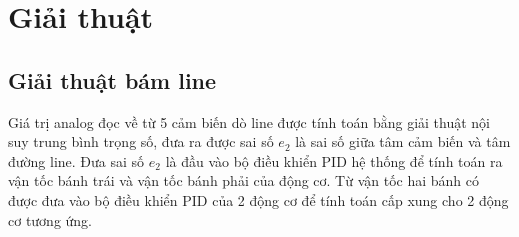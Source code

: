      \section{Giải thuật}
          \subsection{Giải thuật bám line}
               \hspace*{0.6cm}Giá trị analog đọc về từ 5 cảm biến dò line được tính toán bằng giải thuật nội suy
               trung bình trọng số, đưa ra được sai số $e_2$ là sai số giữa tâm cảm biến và tâm đường
               line. Đưa sai số $e_2$ là đầu vào bộ điều khiển PID hệ thống để tính toán ra vận tốc
               bánh trái và vận tốc bánh phải của động cơ. Từ vận tốc hai bánh có được đưa vào bộ
               điều khiển PID của 2 động cơ để tính toán cấp xung cho 2 động cơ tương ứng.
